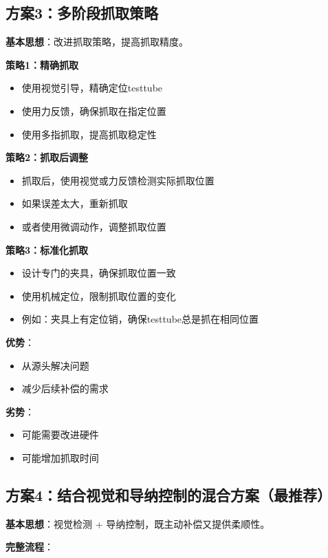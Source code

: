 \documentclass[12pt,a4paper]{article}
\begin{document}
\subsection{方案3：多阶段抓取策略}

\textbf{基本思想}：改进抓取策略，提高抓取精度。

\textbf{策略1：精确抓取}
\begin{itemize}
\item 使用视觉引导，精确定位testtube
\item 使用力反馈，确保抓取在指定位置
\item 使用多指抓取，提高抓取稳定性
\end{itemize}

\textbf{策略2：抓取后调整}
\begin{itemize}
\item 抓取后，使用视觉或力反馈检测实际抓取位置
\item 如果误差太大，重新抓取
\item 或者使用微调动作，调整抓取位置
\end{itemize}

\textbf{策略3：标准化抓取}
\begin{itemize}
\item 设计专门的夹具，确保抓取位置一致
\item 使用机械定位，限制抓取位置的变化
\item 例如：夹具上有定位销，确保testtube总是抓在相同位置
\end{itemize}

\textbf{优势}：
\begin{itemize}
\item 从源头解决问题
\item 减少后续补偿的需求
\end{itemize}

\textbf{劣势}：
\begin{itemize}
\item 可能需要改进硬件
\item 可能增加抓取时间
\end{itemize}

\subsection{方案4：结合视觉和导纳控制的混合方案（最推荐）}

\textbf{基本思想}：视觉检测 + 导纳控制，既主动补偿又提供柔顺性。

\textbf{完整流程}：
\end{document}
